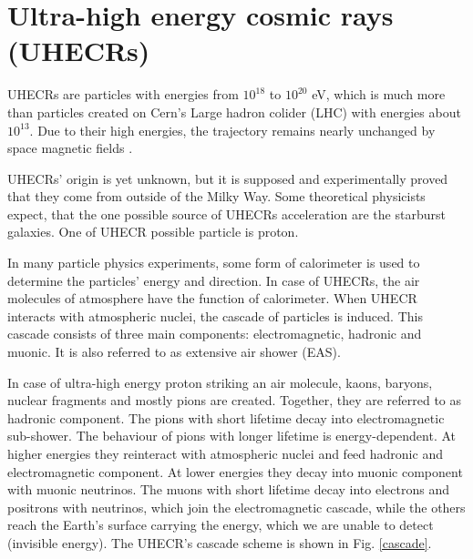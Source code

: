 \section{Ultra-high energy cosmic rays (UHECRs)}
UHECRs are particles with energies from $10^{18}$ to $10^{20}$ eV, which is much more than particles created on Cern's Large hadron colider (LHC) with energies about $10^{13}$. Due to their high energies, the trajectory remains nearly unchanged by space magnetic fields \cite{Benjamin_Skuse}.
\par
UHECRs' origin is yet unknown, but it is supposed and experimentally proved that they come from outside of the Milky Way. Some theoretical physicists expect, that the one possible source of UHECRs acceleration are the starburst galaxies. One of UHECR possible particle is proton. 
\par
In many particle physics experiments, some form of calorimeter is used to determine the particles' energy and direction. In case of UHECRs, the air molecules of atmosphere have the function of calorimeter.
When UHECR interacts with atmospheric nuclei, the cascade of particles is induced. This cascade consists of three main components: electromagnetic, hadronic and muonic. It is also referred to as extensive air shower (EAS).
\par
In case of ultra-high energy proton striking an air molecule, kaons, baryons, nuclear fragments and mostly pions are created. Together, they are referred to as hadronic component. The pions with short lifetime decay into electromagnetic sub-shower. The behaviour of pions with longer lifetime is energy-dependent. At higher energies they reinteract with atmospheric nuclei and feed hadronic and electromagnetic component. At lower energies they decay into muonic component with muonic neutrinos. The muons with short lifetime decay into electrons and positrons with neutrinos, which join the electromagnetic cascade, while the others reach the Earth's surface carrying the energy, which we are unable to detect (invisible energy). The UHECR's cascade scheme is shown in Fig. \ref{cascade}. 
